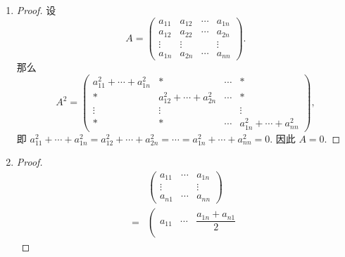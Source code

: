 \begin{enumerate}
\begin{proof}
\[                \right),
            \] 
            即 $A^{n-1}$ 除 $(n-1, n)$ 元素为 $1$ 之外, 其余元素均为 $0$. 因此 $A^{n-1}A = A^n = 0$.
        \end{proof}
    \item %
        \begin{proof}
            设
            \[
                A =
                \left(
                    \begin{array}{cccc}
                        a_{11} & a_{12} & \cdots & a_{1n} \\
                        a_{12} & a_{22} & \cdots & a_{2n} \\
                        \vdots & \vdots &  & \vdots \\
                        a_{1n} & a_{2n} & \cdots & a_{nn}
                    \end{array}
                \right).    
            \]
            那么
            \[
                A^2 =
                \left(
                    \begin{array}{cccc}
                        a_{11}^2 + \cdots + a_{1n}^2 & * & \cdots & * \\
                        * & a_{12}^2 + \cdots + a_{2n}^2 & \cdots & * \\
                        \vdots & \vdots &  & \vdots \\
                        * & * & \cdots & a_{1n}^2 + \cdots + a_{nn}^2
                    \end{array}
                \right),
            \]
            即 $a_{11}^2 + \cdots + a_{1n}^2 = a_{12}^2 + \cdots + a_{2n}^2 = \cdots = a_{1n}^2 + \cdots + a_{nn}^2 = 0$. 因此 $A = 0$.
        \end{proof}
    \item %
        \begin{proof}
            \begin{align*}
                & \left(
                    \begin{array}{cccc}
                        a_{11} & \cdots & a_{1n} \\
                        \vdots &  & \vdots \\
                        a_{n1} & \cdots & a_{nn}
                    \end{array}
                \right) \\
                ={} &
                \left(
                    \begin{array}{cccc}
                        a_{11} & \cdots & \dfrac{a_{1n}+a_{n1}}{2} \\

\end{array}
\end{align*}
\end{proof}
\end{enumerate}
